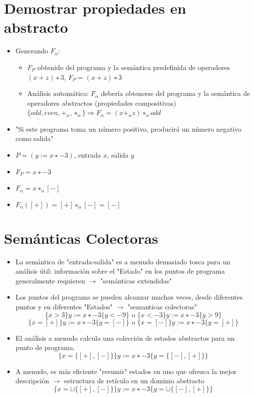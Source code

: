 \documentclass[11pt]{article}
\begin{document}
\section*{Demostrar propiedades en abstracto}
\label{sec:org92725b4}
\begin{itemize}
\item Generando \(F_\alpha\):
\begin{itemize}
\item \(F_P\) obtenido del programa y la semántica predefinida de
operadores \((x + z) ∗ 3\), \(F_P = (x + z) ∗ 3\)
\item Análisis automático: \(F_\alpha\) debería obtenerse del programa y
la semántica de operadores abstractos (propiedades compositivas)
\(\{odd, even, +_\alpha, ∗_\alpha\} \Rightarrow F_\alpha = (x +_\alpha z) ∗_\alpha odd\)
\end{itemize}
\item "Si este programa toma un número positivo, producirá un número
negativo como salida"
\end{itemize}
\begin{itemize}
\item \(P = (y := x ∗ −3)\), entrada \(x\), salida \(y\)
\item \(F_P = x ∗ −3\)
\item \(F_\alpha = x ∗_\alpha [-]\)
\item \(F_\alpha([+]) = [+] ∗_\alpha [-] = [-]\)
\end{itemize}

\section*{Semánticas Colectoras}
\label{sec:org7785a78}
\begin{itemize}
\item La semántica de "entrada-salida" es a menudo demasiado tosca para un
análisis útil: información sobre el "Estado" en los puntos de
programa generalmente requieren \(\to\) "semánticas extendidas"
\item Los puntos del programa se pueden alcanzar muchas veces, desde
diferentes puntos y en diferentes "Estados" \(\to\) "semanticas
colectoras" 
   $$\{x> 3\} y := x ∗ −3 \{y < −9 \} \mbox{ o } \{x < −3\} y := x ∗ −3 \{y > 9 \}$$ 
   $$\{x = [+]\} y := x ∗ −3 \{y = [-]\} \mbox{ o } \{x = [-]\} y := x ∗ −3 \{y = [+]\}$$
\item El análisis a menudo calcula una colección de estados abstractos
para un punto de programa.  $$\{x = \{[+], [-]\}\} y := x ∗ −3 \{y = \{[-], [+]\}\}$$
\item A menudo, es más eficiente "resumir" estados en uno que ofrezca la
mejor descripción \(\to\)  estructura de retículo en un dominio abstracto $$\{x = \sqcup \{[+], [-]\}\} y := x ∗ −3 \{y = \sqcup \{[-], [+]\}\}$$
\end{itemize}
\end{document}
